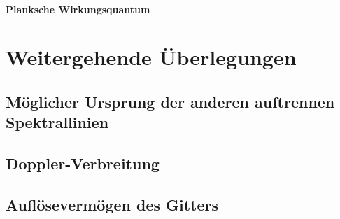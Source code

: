 \paragraph{Planksche Wirkungsquantum}

\section{Weitergehende Überlegungen}
\subsection{Möglicher Ursprung der anderen auftrennen Spektrallinien}
\subsection{Doppler-Verbreitung}
\subsection{Auflösevermögen des Gitters}

